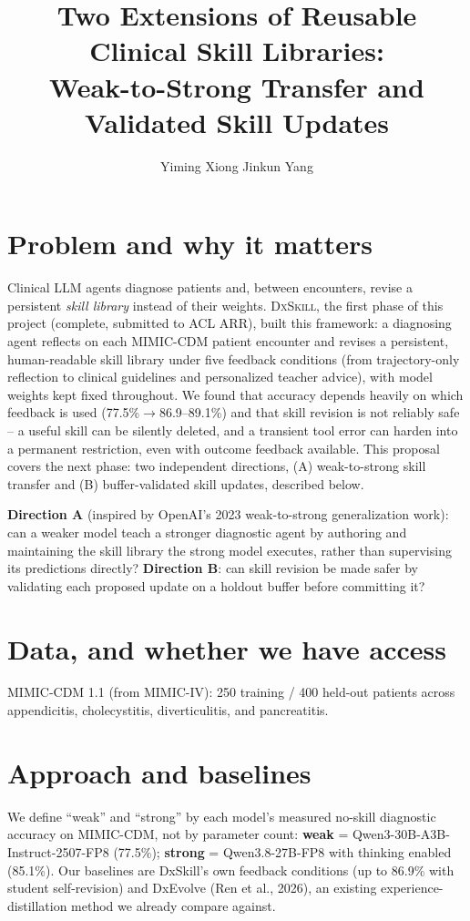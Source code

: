 \documentclass[10pt]{article}
\title{\vspace{-1.6em}\textbf{Two Extensions of Reusable Clinical Skill Libraries:\\
Weak-to-Strong Transfer and Validated Skill Updates}}
\author{\vspace{-0.4em}Yiming Xiong \quad Jinkun Yang}
\date{}
\begin{document}
\maketitle
\vspace{-1.1em}

\section*{Problem and why it matters}
Clinical LLM agents diagnose patients and, between encounters, revise a persistent
\emph{skill library} instead of their weights. \textsc{DxSkill}, the first phase of this
project (complete, submitted to ACL ARR), built this framework: a diagnosing agent
reflects on each MIMIC-CDM patient encounter and revises a persistent, human-readable
skill library under five feedback conditions (from trajectory-only reflection to
clinical guidelines and personalized teacher advice), with model weights kept fixed
throughout. We found that accuracy depends heavily on which feedback is used
(77.5\%$\to$86.9--89.1\%) and that skill revision is not reliably safe -- a useful skill
can be silently deleted, and a transient tool error can harden into a permanent
restriction, even with outcome feedback available. This proposal
covers the next phase: two independent directions, (A) weak-to-strong skill transfer and
(B) buffer-validated skill updates, described below.

\textbf{Direction A} (inspired by OpenAI's 2023 weak-to-strong generalization work): can a
weaker model teach a stronger diagnostic agent by authoring and maintaining the skill
library the strong model executes, rather than supervising its predictions directly?
\textbf{Direction B}: can skill revision be made safer by validating each proposed update
on a holdout buffer before committing it?

\section*{Data, and whether we have access}
MIMIC-CDM 1.1 (from MIMIC-IV): 250 training / 400 held-out patients across appendicitis,
cholecystitis, diverticulitis, and pancreatitis.

\section*{Approach and baselines}
We define ``weak'' and ``strong'' by each model's measured no-skill diagnostic accuracy on
MIMIC-CDM, not by parameter count: \textbf{weak} = Qwen3-30B-A3B-Instruct-2507-FP8
(77.5\%); \textbf{strong} = Qwen3.8-27B-FP8 with thinking enabled (85.1\%). Our baselines
are DxSkill's own feedback conditions (up to 86.9\% with student self-revision) and
DxEvolve (Ren et al., 2026), an existing experience-distillation method we already
compare against.
\end{document}
